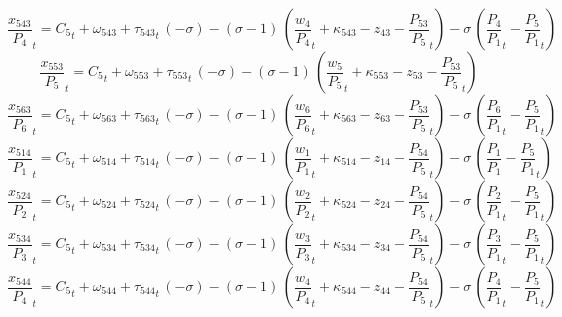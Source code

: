 \begin{dmath}
{{\frac{x_{543}}{P_{4}}}}_{t}={{C_{5}}}_{t}+{{\omega_{543}}}+{{\tau_{543}}}_{t}\, \left(-{{\sigma}}\right)-\left({{\sigma}}-1\right)\, \left({{\frac{w_{4}}{P_{4}}}}_{t}+{{\kappa_{543}}}-{{z_{43}}}-{{\frac{P_{53}}{P_{5}}}}_{t}\right)-{{\sigma}}\, \left({{\frac{P_{4}}{P_{1}}}}_{t}-{{\frac{P_{5}}{P_{1}}}}_{t}\right)
\end{dmath}
\begin{dmath}
{{\frac{x_{553}}{P_{5}}}}_{t}={{C_{5}}}_{t}+{{\omega_{553}}}+{{\tau_{553}}}_{t}\, \left(-{{\sigma}}\right)-\left({{\sigma}}-1\right)\, \left({{\frac{w_{5}}{P_{5}}}}_{t}+{{\kappa_{553}}}-{{z_{53}}}-{{\frac{P_{53}}{P_{5}}}}_{t}\right)
\end{dmath}
\begin{dmath}
{{\frac{x_{563}}{P_{6}}}}_{t}={{C_{5}}}_{t}+{{\omega_{563}}}+{{\tau_{563}}}_{t}\, \left(-{{\sigma}}\right)-\left({{\sigma}}-1\right)\, \left({{\frac{w_{6}}{P_{6}}}}_{t}+{{\kappa_{563}}}-{{z_{63}}}-{{\frac{P_{53}}{P_{5}}}}_{t}\right)-{{\sigma}}\, \left({{\frac{P_{6}}{P_{1}}}}_{t}-{{\frac{P_{5}}{P_{1}}}}_{t}\right)
\end{dmath}
\begin{dmath}
{{\frac{x_{514}}{P_{1}}}}_{t}={{C_{5}}}_{t}+{{\omega_{514}}}+{{\tau_{514}}}_{t}\, \left(-{{\sigma}}\right)-\left({{\sigma}}-1\right)\, \left({{\frac{w_{1}}{P_{1}}}}_{t}+{{\kappa_{514}}}-{{z_{14}}}-{{\frac{P_{54}}{P_{5}}}}_{t}\right)-{{\sigma}}\, \left({{\frac{P_{1}}{P_{1}}}}-{{\frac{P_{5}}{P_{1}}}}_{t}\right)
\end{dmath}
\begin{dmath}
{{\frac{x_{524}}{P_{2}}}}_{t}={{C_{5}}}_{t}+{{\omega_{524}}}+{{\tau_{524}}}_{t}\, \left(-{{\sigma}}\right)-\left({{\sigma}}-1\right)\, \left({{\frac{w_{2}}{P_{2}}}}_{t}+{{\kappa_{524}}}-{{z_{24}}}-{{\frac{P_{54}}{P_{5}}}}_{t}\right)-{{\sigma}}\, \left({{\frac{P_{2}}{P_{1}}}}_{t}-{{\frac{P_{5}}{P_{1}}}}_{t}\right)
\end{dmath}
\begin{dmath}
{{\frac{x_{534}}{P_{3}}}}_{t}={{C_{5}}}_{t}+{{\omega_{534}}}+{{\tau_{534}}}_{t}\, \left(-{{\sigma}}\right)-\left({{\sigma}}-1\right)\, \left({{\frac{w_{3}}{P_{3}}}}_{t}+{{\kappa_{534}}}-{{z_{34}}}-{{\frac{P_{54}}{P_{5}}}}_{t}\right)-{{\sigma}}\, \left({{\frac{P_{3}}{P_{1}}}}_{t}-{{\frac{P_{5}}{P_{1}}}}_{t}\right)
\end{dmath}
\begin{dmath}
{{\frac{x_{544}}{P_{4}}}}_{t}={{C_{5}}}_{t}+{{\omega_{544}}}+{{\tau_{544}}}_{t}\, \left(-{{\sigma}}\right)-\left({{\sigma}}-1\right)\, \left({{\frac{w_{4}}{P_{4}}}}_{t}+{{\kappa_{544}}}-{{z_{44}}}-{{\frac{P_{54}}{P_{5}}}}_{t}\right)-{{\sigma}}\, \left({{\frac{P_{4}}{P_{1}}}}_{t}-{{\frac{P_{5}}{P_{1}}}}_{t}\right)
\end{dmath}
